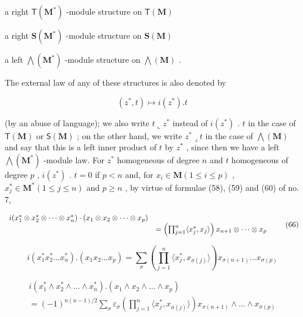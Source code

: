 a right \(\mathsf{T}(\mathbf{M}^{*})\) -module structure on \(\mathsf{T}(\mathbf{M})\)

a right \(\mathbf{S}(\mathbf{M}^{*})\) -module structure on \(\mathbf{S}(\mathbf{M})\)

a left \(\bigwedge (\mathbf{M}^{*})\) -module structure on \(\bigwedge (\mathbf{M})\) .

The external law of any of these structures is also denoted by

\[
(z ^ {*}, t) \mapsto i (z ^ {*}). t
\]

(by an abuse of language); we also write \(t \llcorner z^*\) instead of \(i(z^*)\) . \(t\) in the case of \(\mathsf{T}(\mathbf{M})\) or \(\mathsf{S}(\mathbf{M})\) ; on the other hand, we write \(z^* \lrcorner t\) in the case of \(\bigwedge (\mathbf{M})\) and say that this is a left inner product of \(t\) by \(z^*\) , since then we have a left \(\bigwedge (\mathbf{M}^*)\) -module law. For \(z^*\) homogeneous of degree \(n\) and \(t\) homogeneous of degree \(p\) , \(i(z^*)\) . \(t = 0\) if \(p < n\) and, for \(x_i \in \mathbf{M} (1 \leqslant i \leqslant p)\) , \(x_j^* \in \mathbf{M}^* (1 \leqslant j \leqslant n)\) and \(p \geqslant n\) , by virtue of formulae (58), (59) and (60) of no. 7,

\[
\begin{array}{r l} i (x _ {1} ^ {*} \otimes x _ {2} ^ {*} \otimes \dots \otimes x _ {n} ^ {*}) \cdot (x _ {1} \otimes x _ {2} \otimes \dots \otimes x _ {p}) \\ & = \left(\prod_ {j = 1} ^ {n} \langle x _ {j} ^ {*}, x _ {j} \rangle\right) x _ {n + 1} \otimes \dots \otimes x _ {p} \end{array}\tag{66}
\]

\[
i \left(x _ {1} ^ {*} x _ {2} ^ {*} \dots x _ {n} ^ {*}\right). (x _ {1} x _ {2} \dots x _ {p}) = \sum_ {\sigma} \left(\prod_ {j = 1} ^ {n} \langle x _ {j} ^ {*}, x _ {\sigma (j)} \rangle\right) x _ {\sigma (n + 1)} \dots x _ {\sigma (p)}\tag{67}
\]

\[
\begin{array}{l} i \left(x _ {1} ^ {*} \wedge x _ {2} ^ {*} \wedge \dots \wedge x _ {n} ^ {*}\right). \left(x _ {1} \wedge x _ {2} \wedge \dots \wedge x _ {p}\right) \\ = (- 1) ^ {n (n - 1) / 2} \sum_ {\sigma} \varepsilon_ {\sigma} \left(\prod_ {j = 1} ^ {n} \langle x _ {j} ^ {*}, x _ {\sigma (j)} \rangle\right) x _ {\sigma (n + 1)} \wedge \dots \wedge x _ {\sigma (p)} \end{array}\tag{68}
\]

